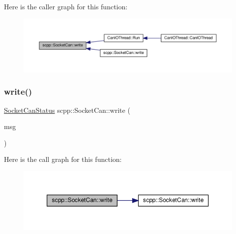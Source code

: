 Here is the caller graph for this function\+:
\nopagebreak
\begin{figure}[H]
\begin{center}
\leavevmode
\includegraphics[width=350pt]{classscpp_1_1SocketCan_af0e968a352380922dcde307e73b76f12_icgraph}
\end{center}
\end{figure}
\mbox{\label{classscpp_1_1SocketCan_a323054409494c177ac8a5522d760c012}} 
\subsubsection{\texorpdfstring{write()}{write()}\hspace{0.1cm}{\footnotesize\ttfamily [2/3]}}
{\footnotesize\ttfamily \hyperlink{namespacescpp_abc60b9ed5f90c311397500d39ff15ef2}{Socket\+Can\+Status} scpp\+::\+Socket\+Can\+::write (\begin{DoxyParamCaption}\item[{const \hyperlink{structscpp_1_1CanFrame}{Can\+Frame} \&}]{msg }\end{DoxyParamCaption})}

Here is the call graph for this function\+:
\nopagebreak
\begin{figure}[H]
\begin{center}
\leavevmode
\includegraphics[width=350pt]{classscpp_1_1SocketCan_a323054409494c177ac8a5522d760c012_cgraph}
\end{center}
\end{figure}
\mbox{\label{classscpp_1_1SocketCan_a3e4e4ca4931587c466801e01183942f4}} 
